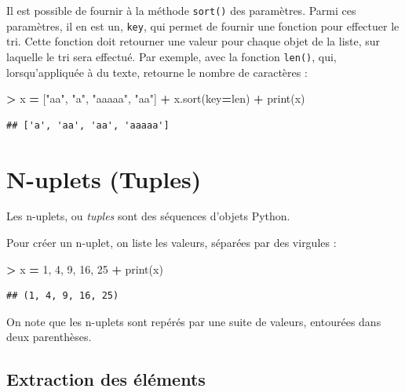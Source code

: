 \documentclass[12pt,]{book}
\newenvironment{Shaded}{\begin{snugshade}}{\end{snugshade}}
\newcommand{\DecValTok}[1]{\textcolor[rgb]{0.00,0.00,0.81}{#1}}
\newcommand{\StringTok}[1]{\textcolor[rgb]{0.31,0.60,0.02}{#1}}
\newcommand{\OperatorTok}[1]{\textcolor[rgb]{0.81,0.36,0.00}{\textbf{#1}}}
\newcommand{\BuiltInTok}[1]{#1}
\newcommand{\NormalTok}[1]{#1}
\numberwithin{equation}{section}
\numberwithin{countremarque}{section}
\begin{document}
Il est possible de fournir à la méthode \texttt{sort()} des paramètres.
Parmi ces paramètres, il en est un, \texttt{key}, qui permet de fournir
une fonction pour effectuer le tri. Cette fonction doit retourner une
valeur pour chaque objet de la liste, sur laquelle le tri sera effectué.
Par exemple, avec la fonction \texttt{len()}, qui, lorsqu'appliquée à du
texte, retourne le nombre de caractères :

\begin{Shaded}
\begin{Highlighting}[]
\OperatorTok{>}\NormalTok{ x }\OperatorTok{=}\NormalTok{ [}\StringTok{"aa"}\NormalTok{, }\StringTok{"a"}\NormalTok{, }\StringTok{"aaaaa"}\NormalTok{, }\StringTok{"aa"}\NormalTok{]}
\OperatorTok{+}\NormalTok{ x.sort(key}\OperatorTok{=}\BuiltInTok{len}\NormalTok{)}
\OperatorTok{+} \BuiltInTok{print}\NormalTok{(x)}
\end{Highlighting}
\end{Shaded}

\begin{lstlisting}
## ['a', 'aa', 'aa', 'aaaaa']
\end{lstlisting}

\section{N-uplets (Tuples)}\label{n-uplets-tuples}

Les n-uplets, ou \emph{tuples} sont des séquences d'objets Python.

Pour créer un n-uplet, on liste les valeurs, séparées par des virgules :

\begin{Shaded}
\begin{Highlighting}[]
\OperatorTok{>}\NormalTok{ x }\OperatorTok{=} \DecValTok{1}\NormalTok{, }\DecValTok{4}\NormalTok{, }\DecValTok{9}\NormalTok{, }\DecValTok{16}\NormalTok{, }\DecValTok{25}
\OperatorTok{+} \BuiltInTok{print}\NormalTok{(x)}
\end{Highlighting}
\end{Shaded}

\begin{lstlisting}
## (1, 4, 9, 16, 25)
\end{lstlisting}

On note que les n-uplets sont repérés par une suite de valeurs,
entourées dans deux parenthèses.

\subsection{Extraction des éléments}\label{extraction-des-elements}
\end{document}
